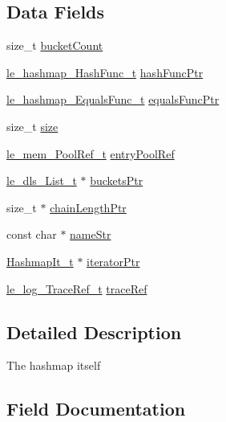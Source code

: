 \subsection*{Data Fields}
\begin{DoxyCompactItemize}
\item 
size\+\_\+t \hyperlink{struct_hashmap__t_a59986f780fbc52d2a7a842603b92b52d}{bucket\+Count}
\item 
\hyperlink{le__hashmap_8h_a354b7f0a30dd40266d367351a4b248b7}{le\+\_\+hashmap\+\_\+\+Hash\+Func\+\_\+t} \hyperlink{struct_hashmap__t_a5587251cbb31b6115f9c6889dcc3747c}{hash\+Func\+Ptr}
\item 
\hyperlink{le__hashmap_8h_adfe15673aeaa2400d3147d62abffee40}{le\+\_\+hashmap\+\_\+\+Equals\+Func\+\_\+t} \hyperlink{struct_hashmap__t_a9d0f70f317aadb90017408340f978f70}{equals\+Func\+Ptr}
\item 
size\+\_\+t \hyperlink{struct_hashmap__t_a4033cab9310a81f5422f78cb4222c172}{size}
\item 
\hyperlink{le__mem_8h_a44a896f6a0a1a8c733e8038eb332989e}{le\+\_\+mem\+\_\+\+Pool\+Ref\+\_\+t} \hyperlink{struct_hashmap__t_a2e289f6384e744f9175733464d7c32f0}{entry\+Pool\+Ref}
\item 
\hyperlink{structle__dls___list__t}{le\+\_\+dls\+\_\+\+List\+\_\+t} $\ast$ \hyperlink{struct_hashmap__t_aee50451ca9ec0fcb04eec7de5f68b54f}{buckets\+Ptr}
\item 
size\+\_\+t $\ast$ \hyperlink{struct_hashmap__t_a61a2945c8ea1ceef4e0424f2bcc6439c}{chain\+Length\+Ptr}
\item 
const char $\ast$ \hyperlink{struct_hashmap__t_a4cb4fe5b623e15ed5d4b18ef51c1c989}{name\+Str}
\item 
\hyperlink{struct_hashmap_it__t}{Hashmap\+It\+\_\+t} $\ast$ \hyperlink{struct_hashmap__t_aac110660e8d339fb694a0445428c515f}{iterator\+Ptr}
\item 
\hyperlink{le__log_8h_a055e29785e8d1c5bf1b3a230df8d65b7}{le\+\_\+log\+\_\+\+Trace\+Ref\+\_\+t} \hyperlink{struct_hashmap__t_aae3a70b3fdc983893549c030a29b19de}{trace\+Ref}
\end{DoxyCompactItemize}


\subsection{Detailed Description}
The hashmap itself 

\subsection{Field Documentation}
